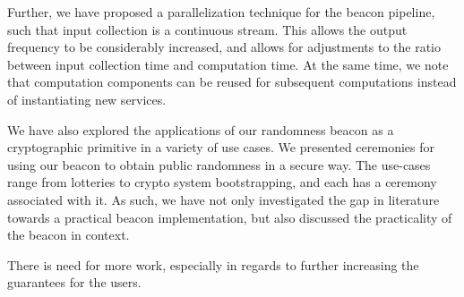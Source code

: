 Further, we have proposed a parallelization technique for the beacon pipeline, such that input collection is a continuous stream. This allows the output frequency to be considerably increased, and allows for adjustments to the ratio between input collection time and computation time. At the same time, we note that computation components can be reused for subsequent computations instead of instantiating new services.

We have also explored the applications of our randomness beacon as a cryptographic primitive in a variety of use cases. We presented ceremonies for using our beacon to obtain public randomness in a secure way. The use-cases range from lotteries to crypto system bootstrapping, and each has a ceremony associated with it.
As such, we have not only investigated the gap in literature towards a practical beacon implementation, but also discussed the practicality of the beacon in context.



There is need for more work, especially in regards to further increasing the guarantees for the users.


